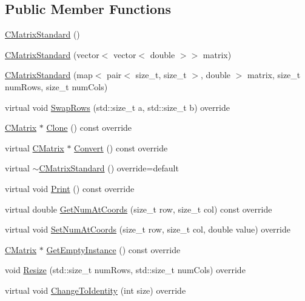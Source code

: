 \subsection*{Public Member Functions}
\begin{DoxyCompactItemize}
\item 
\hyperlink{classCMatrixStandard_ad862ccde0cbe3a1f72e724091040475d}{C\+Matrix\+Standard} ()
\item 
\hyperlink{classCMatrixStandard_a5ae792cb1f82cfd0f8710f22e6c03588}{C\+Matrix\+Standard} (vector$<$ vector$<$ double $>$$>$ matrix)
\item 
\hyperlink{classCMatrixStandard_ae2f8784f0d63aab266bbd144c5cc10c6}{C\+Matrix\+Standard} (map$<$ pair$<$ size\+\_\+t, size\+\_\+t $>$, double $>$ matrix, size\+\_\+t num\+Rows, size\+\_\+t num\+Cols)
\item 
virtual void \hyperlink{classCMatrixStandard_a8c8a6ce02302a423928b725e41c7730a}{Swap\+Rows} (std\+::size\+\_\+t a, std\+::size\+\_\+t b) override
\item 
\hyperlink{classCMatrix}{C\+Matrix} $\ast$ \hyperlink{classCMatrixStandard_a30885c9a67bfe07b8379f7dd7a782ce4}{Clone} () const override
\item 
virtual \hyperlink{classCMatrix}{C\+Matrix} $\ast$ \hyperlink{classCMatrixStandard_a73f39b1ac5602dbd233df469ba8f0c3b}{Convert} () const override
\item 
virtual \hyperlink{classCMatrixStandard_af1c8dfb0c0bdc2933fe19dc7deef0a80}{$\sim$\+C\+Matrix\+Standard} () override=default
\item 
virtual void \hyperlink{classCMatrixStandard_a0ace6054f9ec1fb2b26e0683034e48bd}{Print} () const override
\item 
virtual double \hyperlink{classCMatrixStandard_a277c77a453dccdac55de180bb63a8a7f}{Get\+Num\+At\+Coords} (size\+\_\+t row, size\+\_\+t col) const override
\item 
virtual void \hyperlink{classCMatrixStandard_a7fe5561630fbc65f7aeac5bd54499c13}{Set\+Num\+At\+Coords} (size\+\_\+t row, size\+\_\+t col, double value) override
\item 
\hyperlink{classCMatrix}{C\+Matrix} $\ast$ \hyperlink{classCMatrixStandard_a17e51335d1d9e731441a8205536697f7}{Get\+Empty\+Instance} () const override
\item 
void \hyperlink{classCMatrixStandard_ad135e13127c58f91c325a131d1dc8a74}{Resize} (std\+::size\+\_\+t num\+Rows, std\+::size\+\_\+t num\+Cols) override
\item 
virtual void \hyperlink{classCMatrixStandard_ac46d74a3b3f53c0eb0bbd69668b7d8a9}{Change\+To\+Identity} (int size) override
$$
\end{DoxyCompactItemize}
